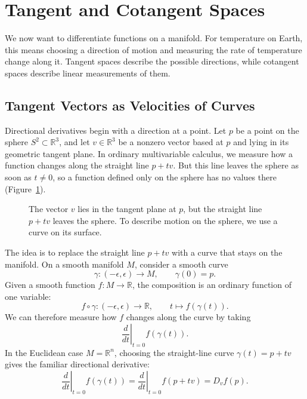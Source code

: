 \section{Tangent and Cotangent Spaces}
    \label{sec:tangent-cotangent}

    We now want to differentiate functions on a manifold. For temperature on
    Earth, this means choosing a direction of motion and measuring the rate
    of temperature change along it. Tangent spaces describe the possible
    directions, while cotangent spaces describe linear measurements of them.

    \subsection{Tangent Vectors as Velocities of Curves}
    Directional derivatives begin with a direction at a point. Let $p$ be a
    point on the sphere $S^2\subset\mathbb{R}^3$, and let $v\in\mathbb{R}^3$
    be a nonzero vector based at $p$ and lying in its geometric tangent plane.
    In ordinary multivariable calculus, we measure how a function changes
    along the straight line $p+tv$. But this line leaves the sphere as soon
    as $t\ne0$, so a function defined only on the sphere has no values there
    (Figure~\ref{fig:sphere_direction}).

    \begin{figure}[!ht]
        \centering
        
        \caption{%
            The vector $v$ lies in the tangent plane at $p$, but the straight
            line $p+tv$ leaves the sphere. To describe motion on the sphere,
            we use a curve on its surface.
        }
        \label{fig:sphere_direction}
    \end{figure}

    The idea is to replace the straight line $p+tv$ with a curve that stays
    on the manifold. On a smooth manifold $M$, consider a smooth curve
    \begin{equation}
        \gamma\colon(-\epsilon,\epsilon)\to M,\qquad\gamma(0)=p.
    \end{equation}
    Given a smooth function $f\colon M\to\mathbb{R}$, the composition is an
    ordinary function of one variable:
    \[
        f\circ\gamma\colon(-\epsilon,\epsilon)\to\mathbb{R},
        \qquad t\mapsto f(\gamma(t)).
    \]
    We can therefore measure how $f$ changes along the curve by taking
    \begin{equation}
        \left.\frac{d}{dt}\right|_{t=0}f(\gamma(t)).
    \end{equation}
    In the Euclidean case $M=\mathbb{R}^n$, choosing the straight-line curve
    $\gamma(t)=p+tv$ gives the familiar directional derivative:
    \begin{equation}
        \left.\frac{d}{dt}\right|_{t=0}f(\gamma(t))
        =\left.\frac{d}{dt}\right|_{t=0}f(p+tv)=D_vf(p).
    \end{equation}

